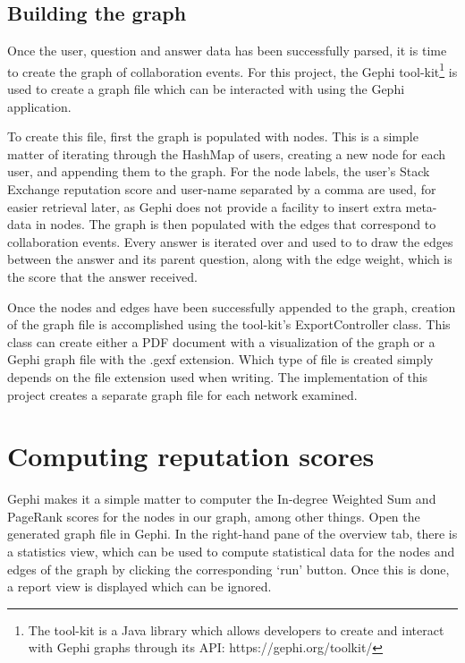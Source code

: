 \documentclass[]{final_report}
\begin{document}
\subsection{Building the graph}

Once the user, question and answer data has been successfully parsed, it is time to create the graph of collaboration events. For this project, the Gephi tool-kit\footnote{The tool-kit is a Java library which allows developers to create and interact with Gephi graphs through its API: https://gephi.org/toolkit/} is used to create a graph file which can be interacted with using the Gephi application.

To create this file, first the graph is populated with nodes. This is a simple matter of iterating through the HashMap of users, creating a new node for each user, and appending them to the graph. For the node labels, the user's Stack Exchange reputation score and user-name separated by a comma are used, for easier retrieval later, as Gephi does not provide a facility to insert extra meta-data in nodes. The graph is then populated with the edges that correspond to collaboration events. Every answer is iterated over and used to to draw the edges between the answer and its parent question, along with the edge weight, which is the score that the answer received. 

Once the nodes and edges have been successfully appended to the graph, creation of the graph file is accomplished using the tool-kit's ExportController class. This class can create either a PDF document with a visualization of the graph or a Gephi graph file with the .gexf extension. Which type of file is created simply depends on the file extension used when writing. The implementation of this project creates a separate graph file for each network examined.

\section{Computing reputation scores}
\label{sec:computingrep}

Gephi makes it a simple matter to computer the In-degree Weighted Sum and PageRank scores for the nodes in our graph, among other things. Open the generated graph file in Gephi. In the right-hand pane of the overview tab, there is a statistics view, which can be used to compute statistical data for the nodes and edges of the graph by clicking the corresponding `run' button. Once this is done, a report view is displayed which can be ignored.
\end{document}
